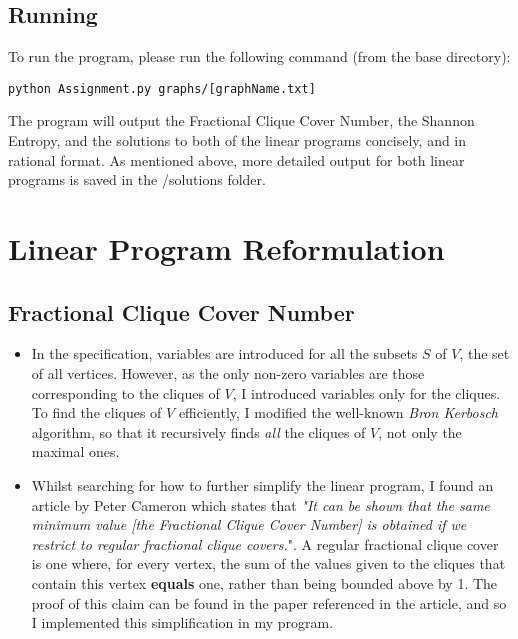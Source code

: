 \documentclass[a4paper]{article}
\begin{document}
\subsection{Running}
To run the program, please run the following command (from the base directory):
\begin{center}
\centering
\begin{BVerbatim}
python Assignment.py graphs/[graphName.txt] 
\end{BVerbatim}
\end{center}
The program will output the Fractional Clique Cover Number, the Shannon Entropy, and the solutions to both of the linear programs concisely, and in rational format. As mentioned above, more detailed output for both linear programs is saved in the /solutions folder.        

\section{Linear Program Reformulation}                                                                                                                                                                                                                                                                                         
\subsection{Fractional Clique Cover Number}
\begin{itemize}
\item In the specification, variables are introduced for all the subsets $S$ of $V$, the set of all vertices. However, as the only non-zero variables are those corresponding to the cliques of $V$, I introduced variables only for the cliques. To find the cliques of $V$ efficiently, I modified the well-known \textit{Bron Kerbosch} algorithm, so that it recursively finds \textit{all} the cliques of $V$, not only the maximal ones. 
\item Whilst searching for how to further simplify the linear program, I found an article by Peter Cameron\cite{Article} which states that \textit{"It can be shown that the same minimum value [the Fractional Clique Cover Number] is obtained if we restrict to regular fractional clique covers.}". A regular fractional clique cover is one where, for every vertex, the sum of the values given to the cliques that contain this vertex \textbf{equals} one, rather than being bounded above by 1. The proof of this claim can be found in the paper referenced in the article\cite{Paper}, and so I implemented this simplification in my program.
\end{itemize}
\end{document}
